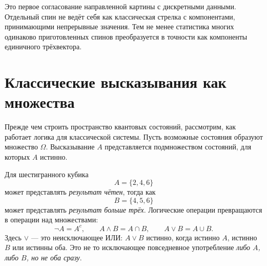 \begin{classroomqa}
\end{classroomqa}

Это первое согласование направленной картины с дискретными данными. Отдельный спин не ведёт себя как классическая стрелка с компонентами, принимающими непрерывные значения. Тем не менее статистика многих одинаково приготовленных спинов преобразуется в точности как компоненты единичного трёхвектора.

\section{Классические высказывания как множества}

Прежде чем строить пространство квантовых состояний, рассмотрим, как работает логика для классической системы. Пусть возможные состояния образуют множество \(\Omega\). Высказывание \(A\) представляется подмножеством состояний, для которых \(A\) истинно.

Для шестигранного кубика
\[
A=\{2,4,6\}
\]
может представлять \emph{результат чётен}, тогда как
\[
B=\{4,5,6\}
\]
может представлять \emph{результат больше трёх}. Логические операции превращаются в операции над множествами:
\begin{equation}
\neg A=A^c,\qquad
A\land B=A\cap B,\qquad
A\lor B=A\cup B.
\label{eq:classical-logic}
\end{equation}
Здесь \(\lor\) — это неисключающее ИЛИ: \(A\lor B\) истинно, когда истинно \(A\), истинно \(B\) или истинны оба. Это не то исключающее повседневное употребление \emph{либо \(A\), либо \(B\), но не оба сразу}.

\begin{classroomqa}
\end{classroomqa}

